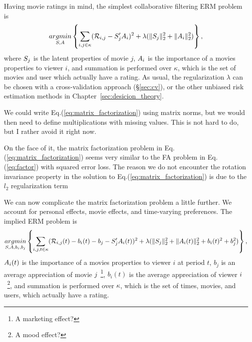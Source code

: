 Having movie ratings in mind, the simplest collaborative filtering ERM problem is 
\begin{align}
\label{eq:matrix_factorization}
	\mathop{argmin} _{S,A}\left\{ \sum_{i,j \in \kappa} (\mathcal{R}_{i,j} - S_j' A_i)^2 + \lambda (\Vert S_j \Vert_2^2+ \Vert A_i \Vert_2^2) \right\},
\end{align}
where $S_j$ is the latent properties of movie $j$, 
$A_i$ is the importance of a movies properties to viewer $i$,
and summation is performed over $\kappa$, which is the set of movies and user which actually have a rating.
As usual, the regularization $\lambda$ can be chosen with a cross-validation approach (\S\ref{sec:cv}), or the other unbiased risk estimation methods in Chapter~\ref{sec:desicion_theory}.

\begin{remark}
We could write Eq.(\ref{eq:matrix_factorization}) using matrix norms, but we would then need to define multiplications with missing values. This is not hard to do, but I rather avoid it right now.
\end{remark}

\begin{remark}
On the face of it, the matrix factorization problem in Eq.(\ref{eq:matrix_factorization}) seems very similar to the FA problem in Eq.(\ref{eq:factor}) with squared error loss.
The reason we do not encounter the rotation invariance property in the solution to Eq.(\ref{eq:matrix_factorization}) is due to the $l_2$ regularization term 
\end{remark}

We can now complicate the matrix factorization problem a little further.
We account for personal effects, movie effects, and time-varying preferences.
The implied ERM problem is 
\begin{align}
\label{eq:matrix_factorization_comlicated}
	\mathop{argmin} _{S,A, b_i, b_j}\left\{ 
		\sum_{i,j,t \in \kappa} (\mathcal{R}_{i,j}(t) - b_i(t) - b_j- S_j' A_i(t))^2 + \lambda (\Vert S_j \Vert_2^2+ \Vert A_i(t) \Vert_2^2 + b_i(t)^2 + b_j^2 )
	 \right\},
\end{align}
$A_i(t)$ is the importance of a movies properties to viewer $i$ at period $t$,
$b_j$ is an average appreciation of movie $j$~\footnote{A marketing effect?},
$b_i(t)$ is the average appreciation of viewer $i$~\footnote{A mood effect?},
and summation is performed over $\kappa$, which is the set of times, movies, and users, which actually have a rating.

